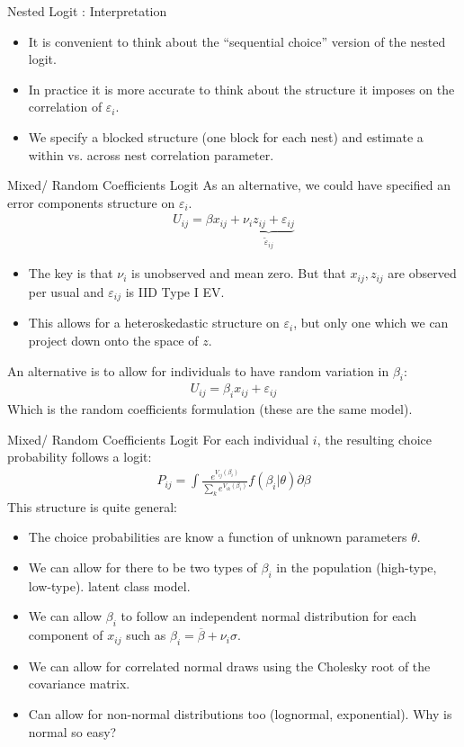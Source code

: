 \documentclass[xcolor=pdftex,dvipsnames,table,mathserif]{beamer}
\begin{document}
\begin{frame}{Nested Logit : Interpretation}
\begin{itemize}
\item It is convenient to think about the ``sequential choice'' version of the nested logit.
\item In practice it is more accurate to think about the structure it imposes on the correlation of $\varepsilon_i$. 
\item We specify a blocked structure (one block for each nest) and estimate a within vs. across nest correlation parameter.
\end{itemize}
\end{frame}


\begin{frame}{Mixed/ Random Coefficients Logit}
As an alternative, we could have specified an error components structure on $\varepsilon_i$.
\begin{eqnarray*}
U_{ij} = \beta x_{ij} + \underbrace{\nu_i z_{ij} + \varepsilon_{ij}}_{\tilde{\varepsilon}_{ij}}
\end{eqnarray*}
\begin{itemize}
\item The key is that $\nu_i$ is unobserved and mean zero. But that $x_{ij},z_{ij}$ are observed per usual and $\varepsilon_{ij}$ is IID Type I EV.
\item This allows for a heteroskedastic structure on $\varepsilon_{i}$, but only one which we can project down onto the space of $z$.
\end{itemize}
An alternative is to allow for individuals to have random variation in $\beta_i$:
\begin{eqnarray*}
U_{ij} = \beta_i x_{ij} +  \varepsilon_{ij}
\end{eqnarray*}
Which is the random coefficients formulation (these are the same model).
\end{frame}

\begin{frame}{Mixed/ Random Coefficients Logit}
For each individual $i$, the resulting choice probability follows a logit:
\begin{eqnarray*}
P_{ij} = \int \frac{ e^{V_{ij}(\beta_i)}}{\sum_k e^{V_{ik}(\beta_i)}} f(\beta_i | \theta) \partial \beta
\end{eqnarray*}
This structure is quite general:
\begin{itemize}
\item The choice probabilities are know a function of unknown parameters $\theta$.
\item We can allow for there to be two types of $\beta_i$ in the population (high-type, low-type). \alert{latent class model}.
\item We can allow $\beta_i$ to follow an independent normal distribution for each component of $x_{ij}$ such as $\beta_i = \overline{\beta} + \nu_i \sigma$.
\item We can allow for correlated normal draws using the Cholesky root of the covariance matrix.
\item Can allow for non-normal distributions too (lognormal, exponential). Why is normal so easy?
\end{itemize}
\end{frame}
\end{document}
